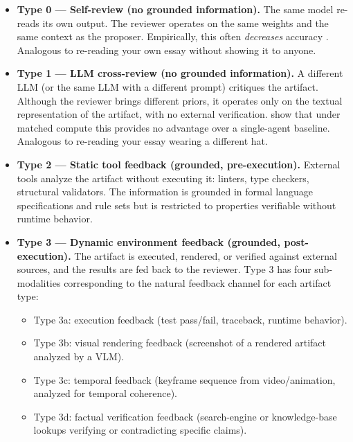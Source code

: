 \documentclass[11pt]{article}
\begin{document}
\begin{itemize}[leftmargin=*,topsep=0.2ex,itemsep=0.4ex]
\item \textbf{Type 0 --- Self-review (no grounded information).} The same model re-reads its own output. The reviewer operates on the same weights and the same context as the proposer. Empirically, this often \emph{decreases} accuracy \citep{huang2024selfcorrect,kamoi2025correct}. Analogous to re-reading your own essay without showing it to anyone.

\item \textbf{Type 1 --- LLM cross-review (no grounded information).} A different LLM (or the same LLM with a different prompt) critiques the artifact. Although the reviewer brings different priors, it operates only on the textual representation of the artifact, with no external verification. \citet{trankiela2026singleagent} show that under matched compute this provides no advantage over a single-agent baseline. Analogous to re-reading your essay wearing a different hat.

\item \textbf{Type 2 --- Static tool feedback (grounded, pre-execution).} External tools analyze the artifact without executing it: linters, type checkers, structural validators. The information is grounded in formal language specifications and rule sets but is restricted to properties verifiable without runtime behavior.

\item \textbf{Type 3 --- Dynamic environment feedback (grounded, post-execution).} The artifact is executed, rendered, or verified against external sources, and the results are fed back to the reviewer. Type 3 has four sub-modalities corresponding to the natural feedback channel for each artifact type:
\begin{itemize}[leftmargin=*,topsep=0.2ex,itemsep=0.2ex]
\item Type 3a: execution feedback (test pass/fail, traceback, runtime behavior).
\item Type 3b: visual rendering feedback (screenshot of a rendered artifact analyzed by a VLM).
\item Type 3c: temporal feedback (keyframe sequence from video/animation, analyzed for temporal coherence).
\item Type 3d: factual verification feedback (search-engine or knowledge-base lookups verifying or contradicting specific claims).
\end{itemize}
\end{itemize}
\end{document}
